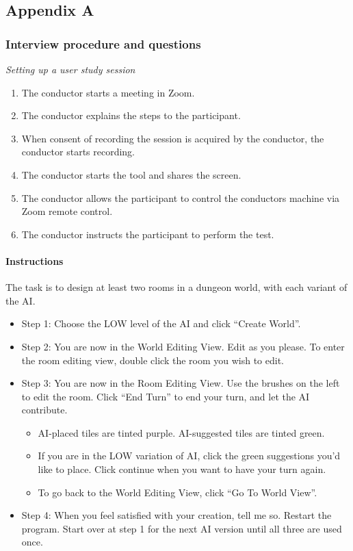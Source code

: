\appendix
\subsection{Appendix A}
\subsubsection{Interview procedure and questions}

\emph{Setting up a user study session}


\begin{enumerate}
    \item The conductor starts a meeting in Zoom.
    \item The conductor explains the steps to the participant.
    \item When consent of recording the session is acquired by the conductor, the conductor starts recording.
    \item The conductor starts the tool and shares the screen.
    \item The conductor allows the participant to control the conductors machine via Zoom remote control.
    \item The conductor instructs the participant to perform the test.
    
\end{enumerate}

\paragraph{Instructions}

The task is to design at least two rooms in a dungeon world, with each variant of the AI.

\begin{itemize}
    \item Step 1: Choose the LOW level of the AI and click “Create World”.

\item Step 2: You are now in the World Editing View. Edit as you please. To enter the room editing view, double click the room you wish to edit.

\item Step 3: You are now in the Room Editing View. Use the brushes on the left to edit the room. Click “End Turn” to end your turn, and let the AI contribute. 

\begin{itemize}
    \item AI-placed tiles are tinted purple. AI-suggested tiles are tinted green.
    \item If you are in the LOW variation of AI, click the green suggestions you’d like to place. Click continue when you want to have your turn again.
    \item To go back to the World Editing View, click “Go To World View”.
\end{itemize}

\item Step 4: When you feel satisfied with your creation, tell me so. Restart the program. Start over at step 1 for the next AI version until all three are used once.

\end{itemize}


